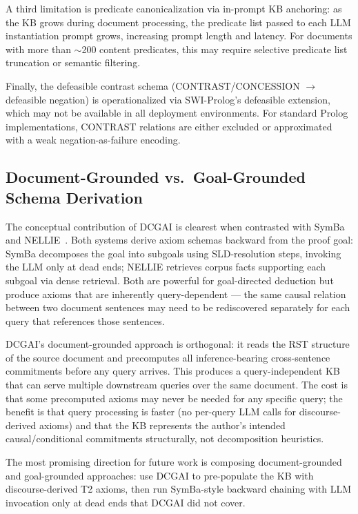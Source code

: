\documentclass[11pt,letterpaper]{article}
\begin{document}
A third limitation is predicate canonicalization via in-prompt KB anchoring: as the KB grows during document
processing, the predicate list passed to each LLM instantiation prompt grows, increasing prompt length and latency.
For documents with more than $\sim$200 content predicates, this may require selective predicate list truncation or
semantic filtering.

Finally, the defeasible contrast schema (CONTRAST/CONCESSION $\rightarrow$ defeasible negation) is operationalized
via SWI-Prolog's defeasible extension, which may not be available in all deployment environments. For standard
Prolog implementations, CONTRAST relations are either excluded or approximated with a weak negation-as-failure
encoding.

\subsection{Document-Grounded vs.\ Goal-Grounded Schema Derivation}

The conceptual contribution of DCGAI is clearest when contrasted with SymBa~\citep{Lee2024} and
NELLIE~\citep{Weir2024}. Both systems derive axiom schemas backward from the proof goal: SymBa decomposes the goal
into subgoals using SLD-resolution steps, invoking the LLM only at dead ends; NELLIE retrieves corpus facts
supporting each subgoal via dense retrieval. Both are powerful for goal-directed deduction but produce axioms that
are inherently query-dependent --- the same causal relation between two document sentences may need to be
rediscovered separately for each query that references those sentences.

DCGAI's document-grounded approach is orthogonal: it reads the RST structure of the source document and precomputes
all inference-bearing cross-sentence commitments before any query arrives. This produces a query-independent KB that
can serve multiple downstream queries over the same document. The cost is that some precomputed axioms may never be
needed for any specific query; the benefit is that query processing is faster (no per-query LLM calls for
discourse-derived axioms) and that the KB represents the author's intended causal/conditional commitments
structurally, not decomposition heuristics.

The most promising direction for future work is composing document-grounded and goal-grounded approaches: use DCGAI
to pre-populate the KB with discourse-derived T2 axioms, then run SymBa-style backward chaining with LLM invocation
only at dead ends that DCGAI did not cover.
\end{document}
